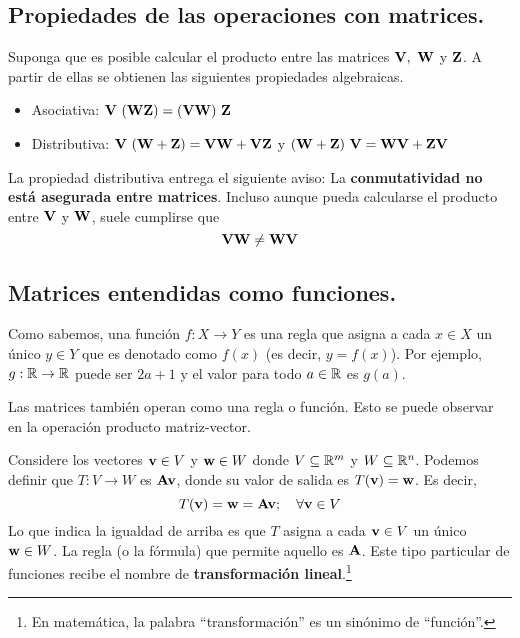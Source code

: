 \documentclass[12pt]{article}
\begin{document}
\subsection{Propiedades de las operaciones con matrices.}

Suponga que es posible calcular el producto entre las matrices $\mathbf{V}, \ \mathbf{W}$ y $\mathbf{Z}$. A partir de ellas se obtienen las siguientes propiedades algebraicas.
\begin{itemize}
\item Asociativa: $\mathbf{V} \ (\mathbf{W} \mathbf{Z}) = (\mathbf{V} \mathbf{W}) \ \mathbf{Z}$
\item Distributiva: $\mathbf{V} \ (\mathbf{W} + \mathbf{Z}) = \mathbf{V}\mathbf{W} + \mathbf{V}\mathbf{Z}$ \hspace{1.5pt} y \hspace{1.5pt} $(\mathbf{W} + \mathbf{Z}) \ \mathbf{V} = \mathbf{W}\mathbf{V} + \mathbf{Z}\mathbf{V}$
\end{itemize}
La propiedad distributiva entrega el siguiente aviso: La \textbf{conmutatividad no está asegurada entre matrices}. Incluso aunque pueda calcularse el producto entre $\mathbf{V}$ y $\mathbf{W}$, suele cumplirse que
\[
  \mathbf{V} \mathbf{W} \neq \mathbf{W} \mathbf{V}
\]

\subsection{Matrices entendidas como funciones.}

Como sabemos, una función $f:X \to Y$ es una regla que asigna a cada $x \in X$ un único $y \in Y$ que es denotado como $f(x)$ (es decir, $y = f(x)$). Por ejemplo, $g:\mathbb{R} \to \mathbb{R}$ puede ser $2a + 1$ y el valor para todo $a \in \mathbb{R}$ es $g(a)$.

Las matrices también operan como una regla o función. Esto se puede observar en la operación producto matriz-vector.

Considere los vectores $\mathbf{v} \in V$ y $\mathbf{w} \in W$ donde $V \subseteq \mathbb{R}^{m}$ y $W \subseteq \mathbb{R}^{n}$. Podemos definir que $T:V \to W$ es $\mathbf{A} \mathbf{v}$, donde su valor de salida es $T(\mathbf{v}) = \mathbf{w}$. Es decir,
\[
  T(\mathbf{v}) = \mathbf{w} = \mathbf{A} \mathbf{v}; \quad \forall \mathbf{v} \in V
\]
Lo que indica la igualdad de arriba es que $T$ asigna a cada $\mathbf{v} \in V$ un único $\mathbf{w} \in W$. La regla (o la fórmula) que permite aquello es $\mathbf{A}$. Este tipo particular de funciones recibe el nombre de \textbf{transformación lineal}.\footnote{En matemática, la palabra ``transformación'' es un sinónimo de ``función''.}
\end{document}
